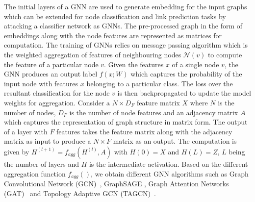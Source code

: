 The initial layers of a GNN are used to generate embedding for the input graphs which can be extended for node classification and link prediction tasks by attacking a classifier network as GNNs.
The pre-processed graph in the form of embeddings along with the node features are represented as matrices for computation.
The training of GNNs relies on message passing algorithm which is the weighted aggregation of features of neighbouring nodes $\mathcal{N}(v)$ to compute the feature of a particular node $v$.
Given the features $x$ of a single node $v$, the GNN produces an output label $f(x;W)$ which captures the probability of the input node with features $x$ belonging to a particular class.
The loss over the resultant classification for the node $v$ is then backpropagated to update the model weights for aggregation.
Consider a $N\times D_F$ feature matrix $X$ where $N$ is the number of nodes, $D_F$ is the number of node features and an adjacency matrix $A$ which captures the representation of graph structure in matrix form.
The output of a layer with $F$ features takes the feature matrix along with the adjacency matrix as input to produce a $N\times F$ matrix as an output.
The computation is given by $H^{(l+1)} = f_{agg}(H^{(l)}, A)$ with $H(0)=X$ and $H(L)=Z$, $L$ being the number of layers and $H$ is the intermediate activation.
Based on the different aggregation function $f_{agg}()$, we obtain different GNN algorithms such as Graph Convolutional Network (GCN)~\cite{Kipf2016tc}, GraphSAGE \cite{NIPS20176703}, Graph Attention Networks (GAT)~\cite{velickovic2018graph} and Topology Adaptive GCN (TAGCN)~\cite{du2018topology}.

